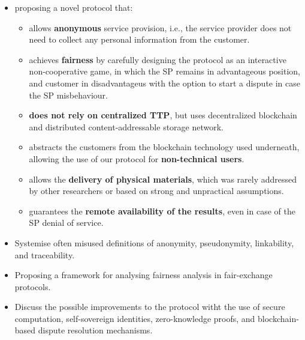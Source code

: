 \documentclass{ieeeaccess}
\begin{document}
\begin{itemize}
\item proposing a novel protocol that:
  \begin{itemize}
  \item allows \textbf{anonymous} service provision, i.e., the service provider does not need to collect any personal information from the customer.
  \item achieves \textbf{fairness} by carefully designing the protocol as an interactive non-cooperative game, in which the SP remains in advantageous position, and customer in disadvantageus with the option to start a dispute in case the SP misbehaviour.
  \item \textbf{does not rely on centralized TTP}, but uses decentralized blockchain and distributed content-addressable storage network.
  \item abstracts the customers from the blockchain technology used underneath, allowing the use of our protocol for \textbf{non-technical users}.
  \item allows the \textbf{delivery of physical materials}, which was rarely addressed by other researchers or based on strong and unpractical assumptions.
  \item guarantees the \textbf{remote availability of the results}, even in case of the SP denial of service.
  \end{itemize} 
\item Systemise often misused definitions of anonymity, pseudonymity, linkability, and traceability.
\item Proposing a framework for analysing fairness analysis in fair-exchange protocols.
\item Discuss the possible improvements to the protocol witht the use of secure computation, self-sovereign identities, zero-knowledge proofs, and blockchain-based dispute resolution mechanisms.
\end{itemize} 

\end{document}
